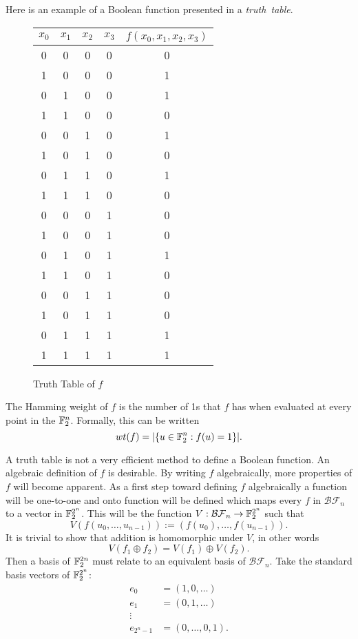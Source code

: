 \par Here is an example of a Boolean function presented in a {\em truth\ table}.
\begin{figure}
\label{fig:truth-table}
	\centering
  \begin{tabular}{|c|c|c|c|c|}
    \hline
    $x_0$&$x_1$&$x_2$&$x_3$&$f(x_0,x_1,x_2,x_3)$\\
    \hline
    0&0&0&0&0\\
    1&0&0&0&1\\
    0&1&0&0&1\\
    1&1&0&0&0\\
    0&0&1&0&1\\
    1&0&1&0&0\\
    0&1&1&0&1\\
    1&1&1&0&0\\
    0&0&0&1&0\\
    1&0&0&1&0\\
    0&1&0&1&1\\
    1&1&0&1&0\\
    0&0&1&1&0\\
    1&0&1&1&0\\
    0&1&1&1&1\\
    1&1&1&1&1\\
  	\hline
	\end{tabular}
	\caption{Truth Table of $f$}
\end{figure}
\par The Hamming weight of $f$ is the number of 1s that $f$ has when evaluated
at every point in the $\mathbb{F}_2^n$. Formally, this can be written
\[
wt(f)=\lvert\{u\in\mathbb{F}_2^n:f(u)=1\}\rvert.
\]
\par A truth table is not a very efficient method to define a Boolean function.
An algebraic definition of $f$ is desirable. By writing $f$ algebraically, more
properties of $f$ will become apparent. As a first step toward defining $f$
algebraically a function will be one-to-one and onto function will be defined
which maps every $f$ in $\mathcal{BF}_n$ to a vector in $\mathbb{F}_2^{2^n}$. This
will be the function $V:\mathcal{BF}_n\rightarrow\mathbb{F}_2^{2^n}$ such that
\begin{equation}\label{eqn:bool-vector}
V(f(u_0,\dots,u_{n-1})):=(f(u_0),\dots,f(u_{n-1})).
\end{equation}
It is trivial to show that addition is homomorphic under $V$, in other words
\[
V(f_1\oplus f_2)=V(f_1)\oplus V(f_2).
\]
Then a basis of $\mathbb{F}_2^{2n}$ must relate to an equivalent basis of
$\mathcal{BF}_n$. Take the standard basis vectors of $\mathbb{F}_2^{2^n}$:
\begin{align*}
	e_0&=(1,0,\dots)\\
	e_1&=(0,1,\dots)\\
	\vdots \\
	e_{2^n-1}&=(0,\dots,0,1).
\end{align*}


